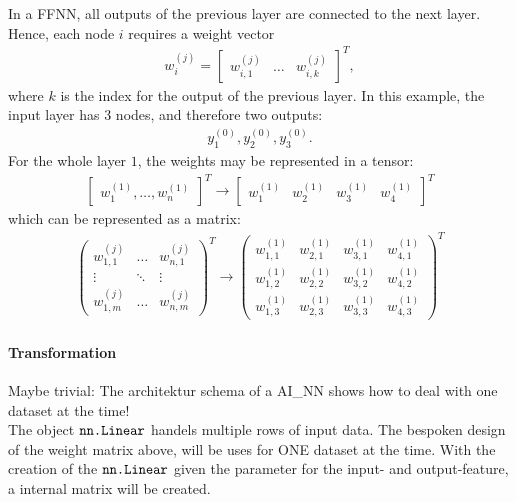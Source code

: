 In a \gls{FFNN}, all outputs of the previous layer are connected to the next layer. Hence, each node $i$ requires a weight vector
\begin{align}
    w^{(j)}_i = \begin{bmatrix} w^{(j)}_{i, 1} & \dots & w^{(j)}_{i, k} \end{bmatrix}^T,
\end{align}
where $k$ is the index for the output of the previous layer. In this example, the input layer has 3 nodes, and therefore two outputs:
\begin{align}
    y^{(0)}_1, y^{(0)}_2, y^{(0)}_3.
\end{align}
For the whole layer $1$, the weights may be represented in a tensor:
\begin{align}
    \begin{bmatrix} w_1^{(1)}, \dots, w_n^{(1)} \end{bmatrix}^T \rightarrow  \begin{bmatrix} w_1^{(1)} & w_2^{(1)} & w_3^{(1)} & w_4^{(1)} \end{bmatrix}^T
\end{align}
which can be represented as a matrix:
\begin{align}
    \begin{pmatrix}
        w^{(j)}_{1, 1} & \dots & w^{(j)}_{n, 1} \\
        \vdots & \ddots & \vdots \\ 
        w^{(j)}_{1, m} & \dots & w^{(j)}_{n, m}
    \end{pmatrix}^T \rightarrow
    \begin{pmatrix}
        w^{(1)}_{1, 1} & w^{(1)}_{2, 1} & w^{(1)}_{3, 1} & w^{(1)}_{4, 1} \\
        w^{(1)}_{1, 2} & w^{(1)}_{2, 2} & w^{(1)}_{3, 2} & w^{(1)}_{4, 2} \\
        w^{(1)}_{1, 3} & w^{(1)}_{2, 3} & w^{(1)}_{3, 3} & w^{(1)}_{4, 3}  
    \end{pmatrix}^T
\end{align}

\paragraph{Transformation}

Maybe trivial: The architektur schema of a \gls{AI_NN} shows how to deal with one dataset at the time!\\

The object $\verb+nn.Linear+$ handels multiple rows of input data. The bespoken design of the weight matrix above, will be uses for ONE dataset at the time. With the creation of the $\verb+nn.Linear+$ given the parameter for the input- and output-feature, a internal matrix will be created.\\

